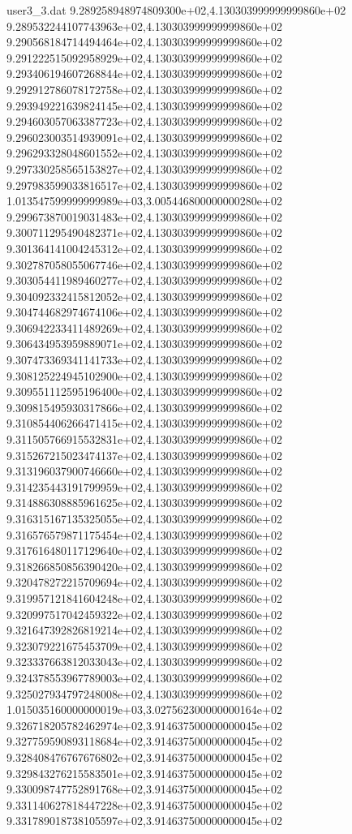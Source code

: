 \begin{filecontents}{user3_3.dat}
9.289258948974809300e+02,4.130303999999999860e+02
9.289532244107743963e+02,4.130303999999999860e+02
9.290568184714494464e+02,4.130303999999999860e+02
9.291222515092958929e+02,4.130303999999999860e+02
9.293406194607268844e+02,4.130303999999999860e+02
9.292912786078172758e+02,4.130303999999999860e+02
9.293949221639824145e+02,4.130303999999999860e+02
9.294603057063387723e+02,4.130303999999999860e+02
9.296023003514939091e+02,4.130303999999999860e+02
9.296293328048601552e+02,4.130303999999999860e+02
9.297330258565153827e+02,4.130303999999999860e+02
9.297983599033816517e+02,4.130303999999999860e+02
1.013547599999999989e+03,3.005446800000000280e+02
9.299673870019031483e+02,4.130303999999999860e+02
9.300711295490482371e+02,4.130303999999999860e+02
9.301364141004245312e+02,4.130303999999999860e+02
9.302787058055067746e+02,4.130303999999999860e+02
9.303054411989460277e+02,4.130303999999999860e+02
9.304092332415812052e+02,4.130303999999999860e+02
9.304744682974674106e+02,4.130303999999999860e+02
9.306942233411489269e+02,4.130303999999999860e+02
9.306434953959889071e+02,4.130303999999999860e+02
9.307473369341141733e+02,4.130303999999999860e+02
9.308125224945102900e+02,4.130303999999999860e+02
9.309551112595196400e+02,4.130303999999999860e+02
9.309815495930317866e+02,4.130303999999999860e+02
9.310854406266471415e+02,4.130303999999999860e+02
9.311505766915532831e+02,4.130303999999999860e+02
9.315267215023474137e+02,4.130303999999999860e+02
9.313196037900746660e+02,4.130303999999999860e+02
9.314235443191799959e+02,4.130303999999999860e+02
9.314886308885961625e+02,4.130303999999999860e+02
9.316315167135325055e+02,4.130303999999999860e+02
9.316576579871175454e+02,4.130303999999999860e+02
9.317616480117129640e+02,4.130303999999999860e+02
9.318266850856390420e+02,4.130303999999999860e+02
9.320478272215709694e+02,4.130303999999999860e+02
9.319957121841604248e+02,4.130303999999999860e+02
9.320997517042459322e+02,4.130303999999999860e+02
9.321647392826819214e+02,4.130303999999999860e+02
9.323079221675453709e+02,4.130303999999999860e+02
9.323337663812033043e+02,4.130303999999999860e+02
9.324378553967789003e+02,4.130303999999999860e+02
9.325027934797248008e+02,4.130303999999999860e+02
1.015035160000000019e+03,3.027562300000000164e+02
9.326718205782462974e+02,3.914637500000000045e+02
9.327759590893118684e+02,3.914637500000000045e+02
9.328408476767676802e+02,3.914637500000000045e+02
9.329843276215583501e+02,3.914637500000000045e+02
9.330098747752891768e+02,3.914637500000000045e+02
9.331140627818447228e+02,3.914637500000000045e+02
9.331789018738105597e+02,3.914637500000000045e+02

\end{filecontents}

